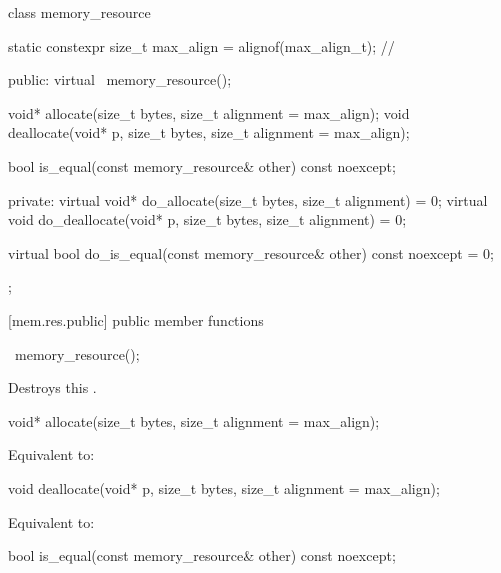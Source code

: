 %
\begin{codeblock}
class memory_resource {
  static constexpr size_t max_align = alignof(max_align_t); // \expos

public:
  virtual ~memory_resource();

  void* allocate(size_t bytes, size_t alignment = max_align);
  void deallocate(void* p, size_t bytes, size_t alignment = max_align);

  bool is_equal(const memory_resource& other) const noexcept;

private:
  virtual void* do_allocate(size_t bytes, size_t alignment) = 0;
  virtual void do_deallocate(void* p, size_t bytes, size_t alignment) = 0;

  virtual bool do_is_equal(const memory_resource& other) const noexcept = 0;
};
\end{codeblock}


[mem.res.public]{ public member functions}

%
\begin{itemdecl}
~memory_resource();
\end{itemdecl}

\begin{itemdescr}
\pnum
\effects
Destroys this .
\end{itemdescr}

%
\begin{itemdecl}
void* allocate(size_t bytes, size_t alignment = max_align);
\end{itemdecl}

\begin{itemdescr}
\pnum
\effects
Equivalent to: 
\end{itemdescr}

%
\begin{itemdecl}
void deallocate(void* p, size_t bytes, size_t alignment = max_align);
\end{itemdecl}

\begin{itemdescr}
\pnum
\effects
Equivalent to: 
\end{itemdescr}

%
\begin{itemdecl}
bool is_equal(const memory_resource& other) const noexcept;
\end{itemdecl}


